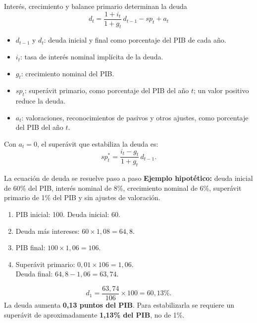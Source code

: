 \begin{frame}{Interés, crecimiento y balance primario determinan la deuda}
\[
\boxed{d_t=\frac{1+i_t}{1+g_t}\,d_{t-1}-sp_t+a_t}
\]
\small
\begin{itemize}
\item $d_{t-1}$ y $d_t$: deuda inicial y final como porcentaje del PIB de cada año.
\item $i_t$: tasa de interés nominal implícita de la deuda.
\item $g_t$: crecimiento nominal del PIB.
\item $sp_t$: superávit primario, como porcentaje del PIB del año $t$; un valor positivo reduce la deuda.
\item $a_t$: valoraciones, reconocimientos de pasivos y otros ajustes, como porcentaje del PIB del año $t$.
\end{itemize}
\vspace{0.15cm}
Con $a_t=0$, el superávit que estabiliza la deuda es:
\[
sp_t^{*}=\frac{i_t-g_t}{1+g_t}\,d_{t-1}.
\]
\end{frame}

\begin{frame}{La ecuación de deuda se resuelve paso a paso}
\small
\textbf{Ejemplo hipotético:} deuda inicial de 60\% del PIB, interés nominal de 8\%, crecimiento nominal de 6\%, superávit primario de 1\% del PIB y sin ajustes de valoración.
\vspace{0.25cm}
\begin{enumerate}
\item PIB inicial: 100. Deuda inicial: 60.
\item Deuda más intereses: $60\times1{,}08=64{,}8$.
\item PIB final: $100\times1{,}06=106$.
\item Superávit primario: $0{,}01\times106=1{,}06$.\\
Deuda final: $64{,}8-1{,}06=63{,}74$.
\end{enumerate}
\[
d_1=\frac{63{,}74}{106}\times100=\boxed{60{,}13\%}.
\]
La deuda aumenta \textbf{0,13 puntos del PIB}. Para estabilizarla se requiere un superávit de aproximadamente \textbf{1,13\% del PIB}, no de 1\%.
\end{frame}

